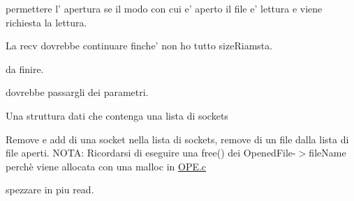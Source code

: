 \begin{DoxyRefList}
permettere l' apertura se il modo con cui e' aperto il file e' lettura e viene richiesta la lettura.  
\item[\label{todo__todo000003}%
\hypertarget{todo__todo000003}{}%
Globale \hyperlink{Client_2READ_8c_a0b8dfa171c3b5c784fb6cba643728110}{read\+From} (\hyperlink{structMyDFSId}{My\+D\+F\+S\+Id} $\ast$id, int size\+Rimasta, int pos)]La recv dovrebbe continuare finche' non ho tutto size\+Riamsta.  
\item[\label{todo__todo000005}%
\hypertarget{todo__todo000005}{}%
Globale \hyperlink{Server_2CLOSE_8c_a12ee57b78a18d7b6afb04b7ea5a98a80}{send\+Invalidate} (\hyperlink{structOpenedFile}{Opened\+File} $\ast$id)]da finire.  
\item[\label{todo__todo000011}%
\hypertarget{todo__todo000011}{}%
Globale \hyperlink{server_8c_a5e7b14672f9e2c9fa99b363004afb8e8}{spawn\+Thread} ()]dovrebbe passargli dei parametri.  
\item[\label{todo__todo000012}%
\hypertarget{todo__todo000012}{}%
File \hyperlink{StruttureDati_8c}{Strutture\+Dati.c} ]Una struttura dati che contenga una lista di sockets 

Remove e add di una socket nella lista di sockets, remove di un file dalla lista di file aperti. N\+O\+T\+A\+: Ricordarsi di eseguire una free() dei Opened\+File-\/$>$file\+Name perchè viene allocata con una malloc in \hyperlink{OPE_8c}{O\+P\+E.\+c} 
\item[\label{todo__todo000001}%
\hypertarget{todo__todo000001}{}%
Globale \hyperlink{Client_2CLOSE_8c_affca868a39ef47e0de0a54b7fca94e10}{upload\+Changes} (\hyperlink{structMyDFSId}{My\+D\+F\+S\+Id} $\ast$id)]spezzare in piu read. 
\end{DoxyRefList}
